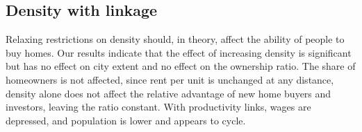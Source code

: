 \subsection{Density with linkage}
Relaxing restrictions on density should, in theory, affect the ability of people to buy homes. Our results indicate that the effect of increasing density is significant but has no effect on city extent and no effect on the ownership ratio. %
The share of homeowners is not affected, since rent per unit is unchanged at any distance, density alone does not affect the relative advantage of new home buyers and investors, leaving the ratio constant. %
With productivity links, wages are depressed, and population is lower and appears to cycle.
